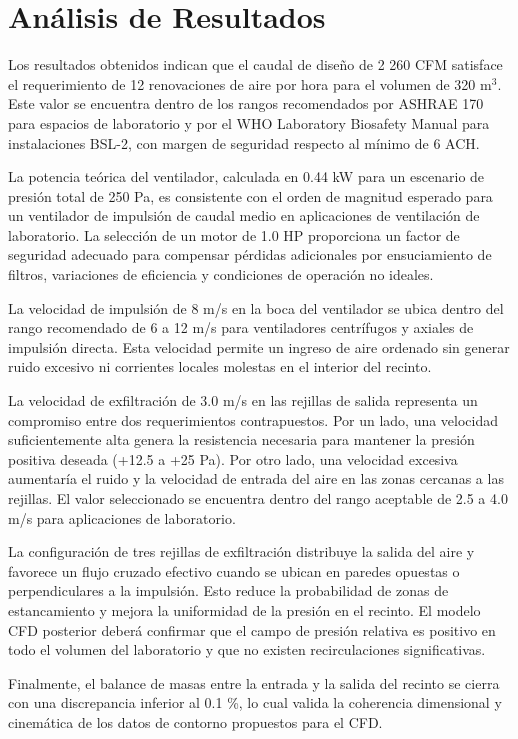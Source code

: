 \section{Análisis de Resultados}

Los resultados obtenidos indican que el caudal de diseño de 2 260 CFM satisface el requerimiento de 12 renovaciones de aire por hora para el volumen de 320 m$^3$. Este valor se encuentra dentro de los rangos recomendados por ASHRAE 170 para espacios de laboratorio y por el WHO Laboratory Biosafety Manual para instalaciones BSL-2, con margen de seguridad respecto al mínimo de 6 ACH.

La potencia teórica del ventilador, calculada en 0.44 kW para un escenario de presión total de 250 Pa, es consistente con el orden de magnitud esperado para un ventilador de impulsión de caudal medio en aplicaciones de ventilación de laboratorio. La selección de un motor de 1.0 HP proporciona un factor de seguridad adecuado para compensar pérdidas adicionales por ensuciamiento de filtros, variaciones de eficiencia y condiciones de operación no ideales.

La velocidad de impulsión de 8 m/s en la boca del ventilador se ubica dentro del rango recomendado de 6 a 12 m/s para ventiladores centrífugos y axiales de impulsión directa. Esta velocidad permite un ingreso de aire ordenado sin generar ruido excesivo ni corrientes locales molestas en el interior del recinto.

La velocidad de exfiltración de 3.0 m/s en las rejillas de salida representa un compromiso entre dos requerimientos contrapuestos. Por un lado, una velocidad suficientemente alta genera la resistencia necesaria para mantener la presión positiva deseada (+12.5 a +25 Pa). Por otro lado, una velocidad excesiva aumentaría el ruido y la velocidad de entrada del aire en las zonas cercanas a las rejillas. El valor seleccionado se encuentra dentro del rango aceptable de 2.5 a 4.0 m/s para aplicaciones de laboratorio.

La configuración de tres rejillas de exfiltración distribuye la salida del aire y favorece un flujo cruzado efectivo cuando se ubican en paredes opuestas o perpendiculares a la impulsión. Esto reduce la probabilidad de zonas de estancamiento y mejora la uniformidad de la presión en el recinto. El modelo CFD posterior deberá confirmar que el campo de presión relativa es positivo en todo el volumen del laboratorio y que no existen recirculaciones significativas.

Finalmente, el balance de masas entre la entrada y la salida del recinto se cierra con una discrepancia inferior al 0.1 \%, lo cual valida la coherencia dimensional y cinemática de los datos de contorno propuestos para el CFD.
